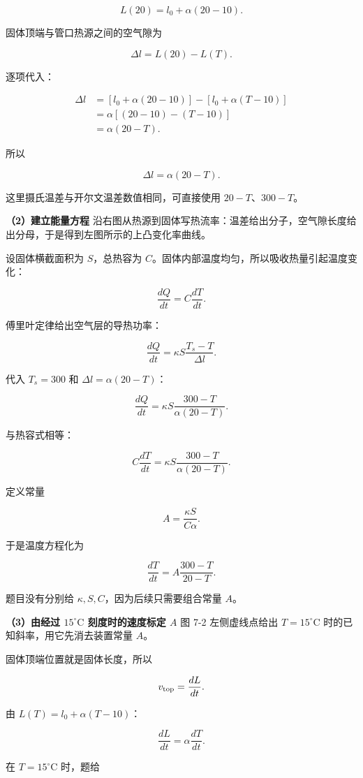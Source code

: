 \documentclass[12pt,a4paper,UTF8]{ctexart}
\begin{document}
\[L(20)=l_0+\alpha(20-10).\]

固体顶端与管口热源之间的空气隙为

\[\Delta l=L(20)-L(T).\]

逐项代入：

\[\begin{aligned}
\Delta l
&=[l_0+\alpha(20-10)]-[l_0+\alpha(T-10)]\\
&=\alpha[(20-10)-(T-10)]\\
&=\alpha(20-T).
\end{aligned}\]

所以

\[\boxed{\Delta l=\alpha(20-T)}.\]

这里摄氏温差与开尔文温差数值相同，可直接使用 \(20-T\)、\(300-T\)。

\textbf{（2）建立能量方程}
沿右图从热源到固体写热流率：温差给出分子，空气隙长度给出分母，于是得到左图所示的上凸变化率曲线。

设固体横截面积为 \(S\)，总热容为
\(C\)。固体内部温度均匀，所以吸收热量引起温度变化：

\[\frac{dQ}{dt}=C\frac{dT}{dt}.\]

傅里叶定律给出空气层的导热功率：

\[\frac{dQ}{dt}=\kappa S\frac{T_s-T}{\Delta l}.\]

代入 \(T_s=300\) 和 \(\Delta l=\alpha(20-T)\)：

\[\frac{dQ}{dt}=\kappa S
\frac{300-T}{\alpha(20-T)}.\]

与热容式相等：

\[C\frac{dT}{dt}=\kappa S
\frac{300-T}{\alpha(20-T)}.\]

定义常量

\[A=\frac{\kappa S}{C\alpha}.\]

于是温度方程化为

\[\boxed{
\frac{dT}{dt}=A\frac{300-T}{20-T}
}.\]

题目没有分别给 \(\kappa,S,C\)，因为后续只需要组合常量 \(A\)。

\textbf{（3）由经过 \(15^\circ\mathrm C\) 刻度时的速度标定 \(A\)} 图 7-2
左侧虚线点给出 \(T=15^\circ\mathrm C\) 时的已知斜率，用它先消去装置常量
\(A\)。

固体顶端位置就是固体长度，所以

\[v_{\rm top}=\frac{dL}{dt}.\]

由 \(L(T)=l_0+\alpha(T-10)\)：

\[\frac{dL}{dt}=\alpha\frac{dT}{dt}.\]

在 \(T=15^\circ\mathrm C\) 时，题给
\end{document}
